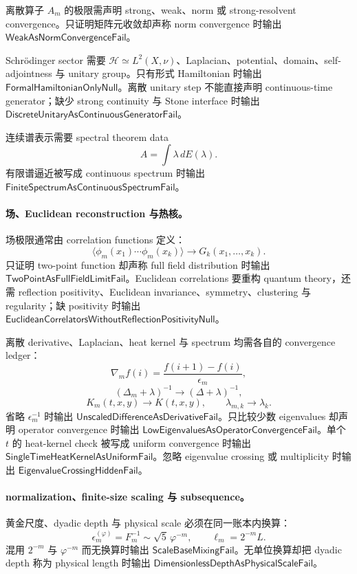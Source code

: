 离散算子 \(A_m\) 的极限需声明 strong、weak、norm 或 strong-resolvent convergence。只证明矩阵元收敛却声称 norm convergence 时输出 \(\mathsf{WeakAsNormConvergenceFail}\)。

Schrödinger sector 需要 \(\mathcal H\simeq L^2(X,\nu)\)、Laplacian、potential、domain、self-adjointness 与 unitary group。只有形式 Hamiltonian 时输出 \(\mathsf{FormalHamiltonianOnlyNull}\)。离散 unitary step 不能直接声明 continuous-time generator；缺少 strong continuity 与 Stone interface 时输出 \(\mathsf{DiscreteUnitaryAsContinuousGeneratorFail}\)。

连续谱表示需要 spectral theorem data
\[
A=\int\lambda\,dE(\lambda).
\]
有限谱逼近被写成 continuous spectrum 时输出 \(\mathsf{FiniteSpectrumAsContinuousSpectrumFail}\)。

\paragraph{场、Euclidean reconstruction 与热核。}
场极限通常由 correlation functions 定义：
\[
\langle\phi_m(x_1)\cdots\phi_m(x_k)\rangle
\to
G_k(x_1,\ldots,x_k).
\]
只证明 two-point function 却声称 full field distribution 时输出 \(\mathsf{TwoPointAsFullFieldLimitFail}\)。Euclidean correlations 要重构 quantum theory，还需 reflection positivity、Euclidean invariance、symmetry、clustering 与 regularity；缺 positivity 时输出 \(\mathsf{EuclideanCorrelatorsWithoutReflectionPositivityNull}\)。

离散 derivative、Laplacian、heat kernel 与 spectrum 均需各自的 convergence ledger：
\[
\nabla_m f(i)=\frac{f(i+1)-f(i)}{\epsilon_m},
\]
\[
(\Delta_m+\lambda)^{-1}\to(\Delta+\lambda)^{-1},
\]
\[
K_m(t,x,y)\to K(t,x,y),
\qquad
\lambda_{m,k}\to\lambda_k.
\]
省略 \(\epsilon_m^{-1}\) 时输出 \(\mathsf{UnscaledDifferenceAsDerivativeFail}\)。只比较少数 eigenvalues 却声明 operator convergence 时输出 \(\mathsf{LowEigenvaluesAsOperatorConvergenceFail}\)。单个 \(t\) 的 heat-kernel check 被写成 uniform convergence 时输出 \(\mathsf{SingleTimeHeatKernelAsUniformFail}\)。忽略 eigenvalue crossing 或 multiplicity 时输出 \(\mathsf{EigenvalueCrossingHiddenFail}\)。

\paragraph{normalization、finite-size scaling 与 subsequence。}
黄金尺度、dyadic depth 与 physical scale 必须在同一账本内换算：
\[
\epsilon_m^{(\varphi)}=F_m^{-1}\sim\sqrt5\,\varphi^{-m},
\qquad
\ell_m=2^{-m}L.
\]
混用 \(2^{-m}\) 与 \(\varphi^{-m}\) 而无换算时输出 \(\mathsf{ScaleBaseMixingFail}\)。无单位换算却把 dyadic depth 称为 physical length 时输出 \(\mathsf{DimensionlessDepthAsPhysicalScaleFail}\)。

